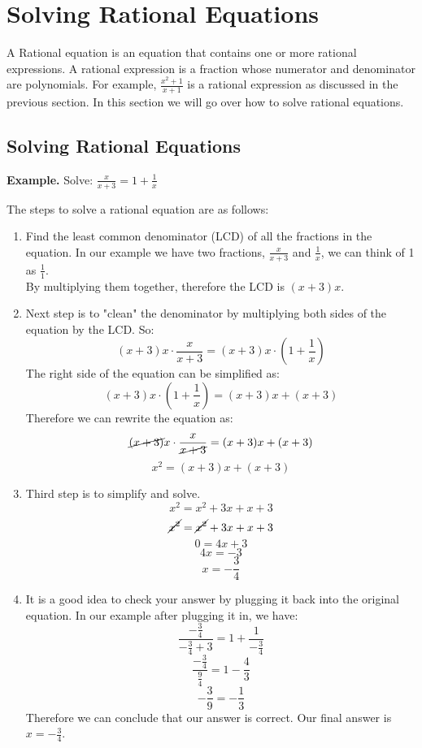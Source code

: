 \section{Solving Rational Equations}
A Rational equation is an equation that contains one or more rational expressions. A rational expression is a fraction whose numerator and denominator are polynomials. For example, $\frac{x^2+1}{x+1}$ is a rational expression as discussed in the previous section. In this section we will go over how to solve rational equations.

\subsection{Solving Rational Equations}

\textbf{Example.} Solve: $\frac{x}{x+3} = 1+\frac{1}{x}$

The steps to solve a rational equation are as follows:
\begin{enumerate}
    \item Find the least common denominator (LCD) of all the fractions in the equation. In our example we have two fractions, $\frac{x}{x+3}$ and $\frac{1}{x}$, we can think of 1 as $\frac{1}{1}$. \\
    By multiplying them together, therefore the LCD is $(x+3)x$.
    \item Next step is to "clean" the denominator  by multiplying both sides of the equation by the LCD. So:
    $$ (x+3)x \cdot \frac{x}{x+3} = (x+3)x \cdot \left(1+\frac{1}{x}\right)$$
    The right side of the equation can be simplified as:
    $$ (x+3)x \cdot \left(1+\frac{1}{x}\right) = (x+3)x + (x+3)$$
    Therefore we can rewrite the equation as:
    $$ \cancel{(x+3)}x \cdot \frac{x}{\cancel{x+3}} =  (x+3)x + (x+3)$$
    $$ x^2 =  (x+3)x + (x+3)$$
    \item Third step is to simplify and solve. 
    $$ x^2 =  x^2+3x+x+3$$
    $$ \cancel{x^2} =  \cancel{x^2}+3x+x+3$$
    $$0 =  4x+3$$
    $$4x =  -3$$
    $$x =  -\frac{3}{4}$$
    \item It is a good idea to check your answer by plugging it back into the original equation. In our example after plugging it in, we have:
    $$ \frac{-\frac{3}{4}}{-\frac{3}{4}+3} = 1+\frac{1}{-\frac{3}{4}}$$
    $$ \frac{-\frac{3}{4}}{\frac{9}{4}} = 1-\frac{4}{3}$$
    $$ -\frac{3}{9} = -\frac{1}{3} $$
    Therefore we can conclude that our answer is correct. Our final answer is $x = -\frac{3}{4}$.
\end{enumerate}


